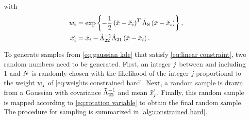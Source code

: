 with
\begin{align}
	\label{eq:weights constrained hard}
	w_{i} &= \exp\left\{  -\frac{1}{2} \left( \breve{x} - \breve{x}_{i} \right)^T
		\tilde{\Lambda}_{\mathrm{S}}
		\left( \breve{x} - \breve{x}_{i} \right) \right\}, \\
	\label{eq:offset constrained hard}
	\tilde{x}_{i}' &= \tilde{x}_{i} - \tilde{\Lambda}_{22}^{-1} \tilde{\Lambda}_{21}
	\left( \breve{x} - \breve{x}_{i} \right).
\end{align}

To generate samples from \cref{eq:gaussian kde} that satisfy \cref{eq:linear constraint}, two random numbers need to be generated. 
First, an integer $j$ between and including $1$ and $N$ is randomly chosen with the likelihood of the integer $j$ proportional to the weight $w_{j}$ of \cref{eq:weights constrained hard}. 
Next, a random sample is drawn from a Gaussian with covariance $\tilde{\Lambda}_{22}^{-1}$ and mean $\tilde{x}_{j}'$.
Finally, this random sample is mapped according to \cref{eq:rotation variable} to obtain the final random sample.
The procedure for sampling is summarized in \cref{alg:constrained hard}.


